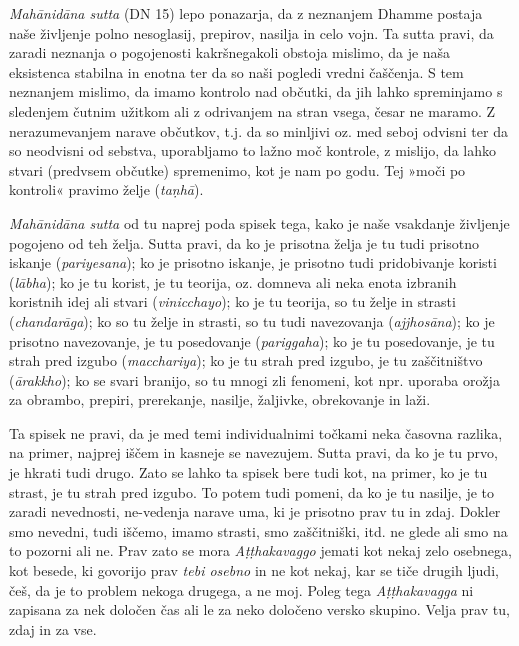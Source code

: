 \emph{Mahānidāna sutta} (DN 15) lepo ponazarja, da z neznanjem Dhamme
postaja naše življenje polno nesoglasij, prepirov, nasilja in celo vojn.
Ta sutta pravi, da zaradi neznanja o pogojenosti kakršnegakoli obstoja
mislimo, da je naša eksistenca stabilna in enotna ter da so naši pogledi
vredni čaščenja. S tem neznanjem mislimo, da imamo kontrolo nad občutki,
da jih lahko spreminjamo s sledenjem čutnim užitkom ali z odrivanjem na
stran vsega, česar ne maramo. Z nerazumevanjem narave občutkov, t.j. da
so minljivi oz. med seboj odvisni ter da so neodvisni od sebstva,
uporabljamo to lažno moč kontrole, z mislijo, da lahko stvari (predvsem
občutke) spremenimo, kot je nam po godu. Tej »moči po kontroli« pravimo
želje (\emph{taṇhā}).

\emph{Mahānidāna sutta} od tu naprej poda spisek tega, kako je naše
vsakdanje življenje pogojeno od teh želja. Sutta pravi, da ko je
prisotna želja je tu tudi prisotno iskanje (\emph{pariyesana}); ko je
prisotno iskanje, je prisotno tudi pridobivanje koristi (\emph{lābha});
ko je tu korist, je tu teorija, oz. domneva ali neka enota izbranih
koristnih idej ali stvari (\emph{vinicchayo}); ko je tu teorija, so tu
želje in strasti (\emph{chandarāga}); ko so tu želje in strasti, so tu
tudi navezovanja (\emph{ajjhosāna}); ko je prisotno navezovanje, je tu
posedovanje (\emph{pariggaha}); ko je tu posedovanje, je tu strah pred
izgubo (\emph{macchariya}); ko je tu strah pred izgubo, je tu
zaščitništvo (\emph{ārakkho}); ko se svari branijo, so tu mnogi zli
fenomeni, kot npr. uporaba orožja za obrambo, prepiri, prerekanje,
nasilje, žaljivke, obrekovanje in laži.

Ta spisek ne pravi, da je med temi individualnimi točkami neka časovna
razlika, na primer, najprej iščem in kasneje se navezujem. Sutta pravi,
da ko je tu prvo, je hkrati tudi drugo. Zato se lahko ta spisek bere
tudi kot, na primer, ko je tu strast, je tu strah pred izgubo. To potem
tudi pomeni, da ko je tu nasilje, je to zaradi nevednosti, ne-vedenja
narave uma, ki je prisotno prav tu in zdaj. Dokler smo nevedni, tudi
iščemo, imamo strasti, smo zaščitniški, itd. ne glede ali smo na to
pozorni ali ne. Prav zato se mora \emph{Aṭṭhakavaggo} jemati kot nekaj
zelo osebnega, kot besede, ki govorijo prav \emph{tebi osebno} in ne kot
nekaj, kar se tiče drugih ljudi, češ, da je to problem nekoga drugega, a
ne moj. Poleg tega \emph{Aṭṭhakavagga} ni zapisana za nek določen čas
ali le za neko določeno versko skupino. Velja prav tu, zdaj in za vse.

